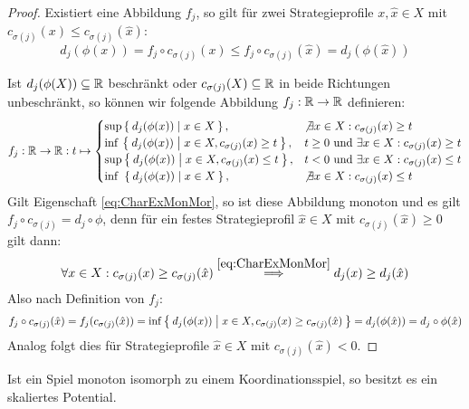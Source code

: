 \begin{proof}
	Existiert eine Abbildung $f_j$, so gilt für zwei Strategieprofile $x, \hat{x} \in X$ mit $c_{\sigma(j)}(x) \leq c_{\sigma(j)}(\hat{x})$:
		\[d_j(\phi(x)) = f_j\circ c_{\sigma(j)}(x) \leq f_j\circ c_{\sigma(j)}(\hat{x}) = d_j(\phi(\hat{x}))\]
		
	Ist $d_j(\phi(X)) \subseteq \mathbb{R}$ beschränkt oder $c_{\sigma(j)}(X) \subseteq \mathbb{R}$ in beide Richtungen unbeschränkt, so können wir folgende Abbildung $f_j: \mathbb{R} \to \mathbb{R}$ definieren:
		\[f_j: \mathbb{R} \to \mathbb{R}: t \mapsto \begin{cases}
			\sup \Set{d_j(\phi(x)) | x \in X},								&\not\exists x \in X: c_{\sigma(j)}(x) \geq t \\
			\inf\, \Set{d_j(\phi(x)) | x \in X, c_{\sigma(j)}(x) \geq t}, 	&t \geq 0 \text{ und } \exists x \in X: c_{\sigma(j)}(x) \geq t\\
			\sup \Set{d_j(\phi(x)) | x \in X, c_{\sigma(j)}(x) \leq t}, 	&t <    0 \text{ und } \exists x \in X: c_{\sigma(j)}(x) \leq t\\
			\inf\,\, \Set{d_j(\phi(x)) | x \in X},							&\not\exists x \in X: c_{\sigma(j)}(x) \leq t 
		\end{cases} \]
	Gilt Eigenschaft \eqref{eq:CharExMonMor}, so ist diese Abbildung monoton und es gilt $f_j\circ c_{\sigma(j)} = d_j \circ \phi$, denn für ein festes Strategieprofil $\hat{x} \in X$ mit $c_{\sigma(j)}(\hat{x}) \geq 0$ gilt dann:
		\[\forall x \in X: c_{\sigma(j)}(x) \geq c_{\sigma(j)}(\hat{x}) \overset{\eqref{eq:CharExMonMor}}{\implies} d_j(x) \geq d_j(\hat{x}) \]
	Also nach Definition von $f_j$:
		\[f_j \circ c_{\sigma(j)}(\hat{x}) = f_j (c_{\sigma(j)}(\hat{x})) = \inf\Set{d_j(\phi(x)) | x \in X, c_{\sigma(j)}(x) \geq c_{\sigma(j)}(\hat{x}) }= d_j(\phi(\hat{x})) = d_j\circ \phi(\hat{x})\]
	Analog folgt dies für Strategieprofile $\hat{x} \in X$ mit $c_{\sigma(j)}(\hat{x}) < 0$.
\end{proof}

\begin{prop}\label{prop:MonIsoKoordDannskPot}
	Ist ein Spiel monoton isomorph zu einem Koordinationsspiel, so besitzt es ein skaliertes Potential.
\end{prop}


